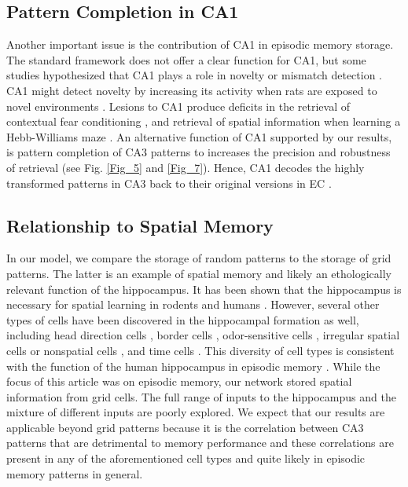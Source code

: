 \documentclass[utf8]{frontiersSCNS} %
\begin{document}
\subsection{Pattern Completion in CA1}
Another important issue is the contribution of CA1 in episodic memory storage. The standard framework does not offer a clear function for CA1, but some studies hypothesized that CA1 plays a role in novelty or mismatch detection \cite{hasselmo1996encoding, lisman2001storage}. CA1 might detect novelty by increasing its activity when rats are exposed to novel environments \cite{karlsson2008network, csicsvari2007place}.
%
Lesions to CA1 produce deficits in the retrieval of contextual fear conditioning \cite{lee2004differential}, and retrieval of spatial information when learning a Hebb-Williams maze \cite{jerman2006disconnection, vago2007role, hunsaker2008double}. 
%
An alternative function of CA1 supported by our results, is pattern completion of CA3 patterns to increases the precision and robustness of retrieval (see Fig. \ref{Fig_5} and \ref{Fig_7}). Hence, CA1 decodes the highly transformed patterns in CA3 back to their original versions in EC \cite{neher2015memory}.


\subsection{Relationship to Spatial Memory}
In our model, we compare the storage of random patterns to the storage of grid patterns. The latter is an example of spatial memory and likely an ethologically relevant function of the hippocampus. It has been shown that the  hippocampus is necessary for spatial learning in rodents \cite{morris1982place} and humans \cite{burgess2002human}.  However, several other types of cells have been discovered in the hippocampal formation as well, including head direction cells \cite{taube1990head}, border cells \cite{solstad2008representation}, odor-sensitive cells \cite{deshmukh2003representation}, irregular spatial cells or nonspatial cells \cite{zhang2013optogenetic}, and time cells \cite{macdonald2011hippocampal, salz2016time}. This diversity of cell types is consistent with the function of the human hippocampus in episodic memory \cite{burgess2002human}. While the focus of this article was on episodic memory, our network stored spatial information from grid cells. The full range of inputs to the hippocampus and the mixture of different inputs are poorly explored. We expect that our results are applicable beyond grid patterns because it is the correlation between CA3 patterns that are detrimental to memory performance and these correlations are present in any of the aforementioned cell types and quite likely in episodic memory patterns in general.
\end{document}
